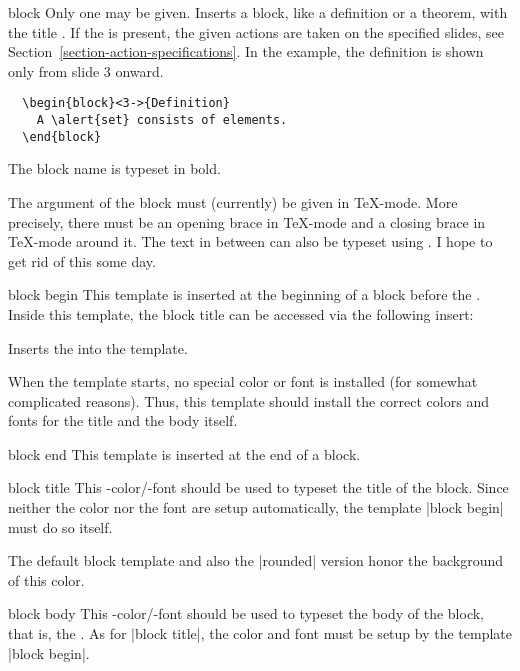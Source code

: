 \begin{environment}{{block}}
  Only one  may be given.
  Inserts a block, like a definition or a theorem, with the title
  . If the  is present,
  the given actions are taken on the specified slides, see
  Section~\ref{section-action-specifications}. In the example, the 
  definition is shown only from slide 3 onward.
  \example
\begin{verbatim}
  \begin{block}<3->{Definition}
    A \alert{set} consists of elements.
  \end{block}
\end{verbatim}

  \articlenote
  The block name is typeset in bold.

  \lyxnote
  The argument of the block must (currently) be given in
  \TeX-mode. More precisely, there must be an opening brace in
  \TeX-mode and a closing brace in \TeX-mode around it. The text
  in between can also be typeset using \LyX. I hope to get rid of this
  some day.

  \begin{element}{block begin}\yes\no\no
    This template is inserted at the beginning of a block before the
    . Inside this
    template, the block title can be accessed via the following
    insert:
    \begin{itemize}
      \iteminsert{\insertblocktitle}
      Inserts the  into the template.
    \end{itemize}

    When the template starts, no special color or font is installed
    (for somewhat complicated reasons). Thus, this template should
    install the correct colors and fonts for the title and the body itself.
  \end{element}

  \begin{element}{block end}\yes\no\no
    This template is inserted at the end of a block.
  \end{element}

  \begin{element}{block title}\no\yes\yes
    This \beamer-color/-font should be used to typeset the title of
    the block. Since neither the color nor the font are setup
    automatically, the template |block begin| must do so itself.

    The default block template and also the |rounded| version honor
    the background of this color.
  \end{element}

  \begin{element}{block body}\no\yes\yes
    This \beamer-color/-font should be used to typeset the body of the
    block, that is, the . As for
    |block title|, the color and font must be setup by the template
    |block begin|.
  \end{element}
\end{environment}


